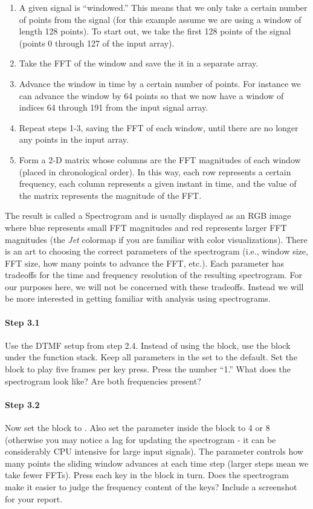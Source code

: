 \begin{enumerate}
\item A given signal is ``windowed.'' This means that we only take a
  certain number of points from the signal (for this example assume we
  are using a window of length 128 points). To start out, we take the
  first 128 points of the signal (points 0 through 127 of the input
  array).
\item Take the FFT of the window and save the it in a separate array.
\item Advance the window in time by a certain number of points. For
  instance we can advance the window by 64 points so that we now have
  a window of indices 64 through 191 from the input signal array.
\item Repeat steps 1-3, saving the FFT of each window, until there are
  no longer any points in the input array.
\item Form a 2-D matrix whose columns are the FFT magnitudes of each
  window (placed in chronological order). In this way, each row
  represents a certain frequency, each column represents a given
  instant in time, and the value of the matrix represents the
  magnitude of the FFT.
\end{enumerate}

The result is called a Spectrogram and is usually displayed as an RGB
image where blue represents small FFT magnitudes and red represents
larger FFT magnitudes (the \emph{Jet} colormap if you are familiar
with color visualizations). There is an art to choosing the correct
parameters of the spectrogram (i.e., window size, FFT size, how many
points to advance the FFT, etc.). Each parameter has tradeoffs for the
time and frequency resolution of the resulting spectrogram. For our
purposes here, we will not be concerned with these tradeoffs. Instead
we will be more interested in getting familiar with analysis using
spectrograms.

\paragraph{Step 3.1} Use the DTMF setup from step 2.4. Instead of
using the  block, use the  block under
the  function stack. Keep all parameters in the
 set to the default. Set the  block to
play five frames per key press. Press the number ``1.'' What does the
spectrogram look like? Are both frequencies present?


\paragraph{Step 3.2} Now set the  block to
. Also set the  parameter inside the
 block to 4 or 8 (otherwise you may notice a lag
for updating the spectrogram - it can be considerably CPU intensive
for large input signals). The  parameter controls
how many points the sliding window advances at each time step (larger
steps mean we take fewer FFTs). Press each key in the 
block in turn. Does the spectrogram make it easier to judge the
frequency content of the keys? Include a screenshot for your report.

